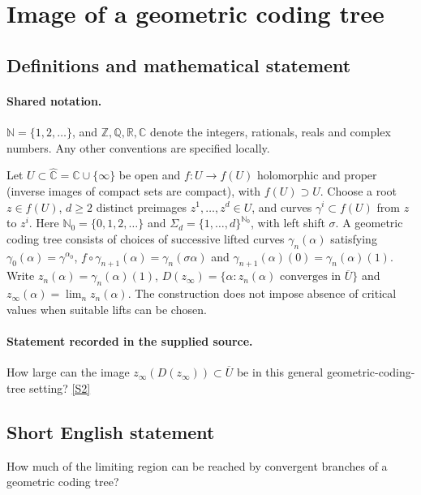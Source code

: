 \documentclass[11pt]{article}
\newcommand{\sref}[2]{\hyperlink{source:#1:#2}{[S#2]}}
\begin{document}
\section{Image of a geometric coding tree}\label{statement}

\subsection{Definitions and mathematical statement}

\paragraph{Shared notation.}$\mathbb N=\{1,2,\ldots\}$, and $\mathbb Z,\mathbb Q,\mathbb R,\mathbb C$ denote the integers, rationals, reals and complex numbers. Any other conventions are specified locally.


Let $U\subset\widehat{\mathbb C}=\mathbb C\cup\{\infty\}$ be open and $f:U\to f(U)$ holomorphic and proper (inverse images of compact sets are compact), with $f(U)\supset U$. Choose a root $z\in f(U)$, $d\geq2$ distinct preimages $z^1,\ldots,z^d\in U$, and curves $\gamma^i\subset f(U)$ from $z$ to $z^i$. Here $\mathbb N_0=\{0,1,2,\ldots\}$ and $\Sigma_d=\{1,\ldots,d\}^{\mathbb N_0}$, with left shift $\sigma$. A geometric coding tree consists of choices of successive lifted curves $\gamma_n(\alpha)$ satisfying $\gamma_0(\alpha)=\gamma^{\alpha_0}$, $f\circ\gamma_{n+1}(\alpha)=\gamma_n(\sigma\alpha)$ and $\gamma_{n+1}(\alpha)(0)=\gamma_n(\alpha)(1)$. Write $z_n(\alpha)=\gamma_n(\alpha)(1)$, $D(z_\infty)=\{\alpha:z_n(\alpha)\text{ converges in }\overline U\}$ and $z_\infty(\alpha)=\lim_n z_n(\alpha)$. The construction does not impose absence of critical values when suitable lifts can be chosen.
\paragraph{Statement recorded in the supplied source.}
How large can the image $z_\infty(D(z_\infty))\subset\overline U$ be in this general geometric-coding-tree setting? \sref{statement}{2}
\subsection{Short English statement}
How much of the limiting region can be reached by convergent branches of a geometric coding tree?
\end{document}
